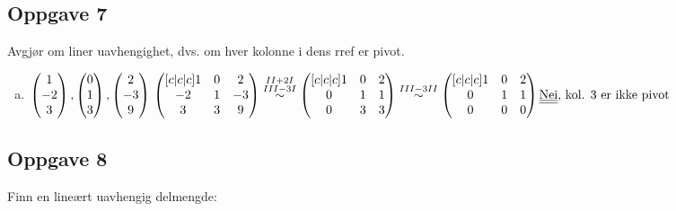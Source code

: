 \documentclass{article}
\newcommand{\vect}[1]{\begin{pmatrix} #1 \end{pmatrix}}
\newcommand{\uu}[1]{\underline{\underline{#1}}}
\newcommand{\eqqto}[1]{\overset{\substack{#1}}{\sim}}
\begin{document}
\subsection*{Oppgave 7}
Avgjør om liner uavhengighet, dvs. om hver kolonne i dens rref er pivot.
\begin{enumerate}[c)]

\item \(
\vect{1\\-2\\3}, \vect{0\\1\\3}, \vect{2\\-3\\9}
\\\\\\
\begin{pmatrix}[c|c|c]
1&0&2\\
-2&1&-3\\
3&3&9
\end{pmatrix}
\eqqto{II+2I\\III-3I}
\begin{pmatrix}[c|c|c]
1&0&2\\
0&1&1\\
0&3&3
\end{pmatrix}
\eqqto{III-3II}
\begin{pmatrix}[c|c|c]
1&0&2\\
0&1&1\\
0&0&0
\end{pmatrix}
\\\\\\
\text{\uu{Nei}, kol. 3 er ikke pivot}
\)

\end{enumerate}


\newpage
\subsection*{Oppgave 8}
Finn en lineært uavhengig delmengde:
\end{document}
